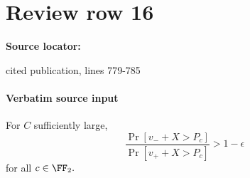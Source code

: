 \documentclass[10pt]{article}
\begin{document}
\section*{Review row 16}
\textbf{Source locator:} {\footnotesize\raggedright cited publication, lines 779-\allowbreak{}785\par}
\paragraph{Verbatim source input}
\begin{ReviewVerbatim}
\begin{lemma}\label{lem:apple}
    For $C$ sufficiently large,
    \begin{equation}
        \frac{\Pr[v_- + X > P_c]}{\Pr[v_+ + X > P_c]} > 1 - \epsilon
    \end{equation}
    for all $c\in \FF_2.$
\end{lemma}
\end{ReviewVerbatim}
\end{document}
